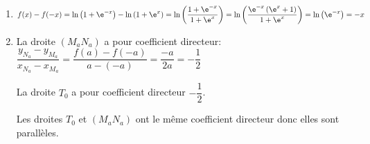 \begin{enumerate}
	\begin{enumerate}
		\item %
$f(x)-f(-x)=\ln \left (1+\e^{-x}\right ) - \ln \left (1+\e^{x}\right )
= \ln \left ( \dfrac{1+\e^{-x}}{1+\e^{x}}\right )
= \ln \left ( \dfrac{\e^{-x}\left (\e^{x}+1\right )}{1+\e^{x}}\right )
= \ln \left (\e^{-x}\right )= -x$		
		
		\item%
La droite $\left(M_aN_a\right)$ a pour coefficient directeur:
$\dfrac{y_{N_a}-y_{M_a}}{x_{N_a}-x_{M_a}}
= \dfrac{f(a)-f(-a)}{a-(-a)}
= \dfrac{-a}{2a}=-\dfrac{1}{2}$

La droite $T_0$ a pour coefficient directeur $-\dfrac{1}{2}$.

Les droites $T_0$ et $\left(M_aN_a\right)$ ont le même coefficient directeur donc elles sont parallèles.
		

	\end{enumerate}
\end{enumerate}


